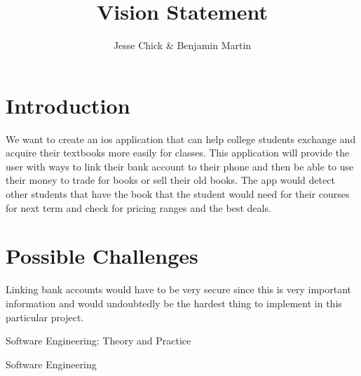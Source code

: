 \documentclass[12pt]{article}
\title{Vision Statement}
\author{Jesse Chick & Benjamin Martin}
\begin{document}
\maketitle
\tableofcontents



\section{Introduction}
We want to create an ios application that can help college students exchange and acquire their textbooks more easily for classes. This application will provide the user with ways to link their bank account to their phone and then be able to use their money to trade for books or sell their old books. The app would detect other students that have the book that the student would need for their courses for next term and check for pricing ranges and the best deals.

\section{Possible Challenges}

Linking bank accounts would have to be very secure since this is very important information and would undoubtedly be the hardest thing to implement in this particular project.


Software Engineering: Theory and Practice~\cite{pfleeger2010software}

Software Engineering~\cite{sommerville2011software}




\end{document}
